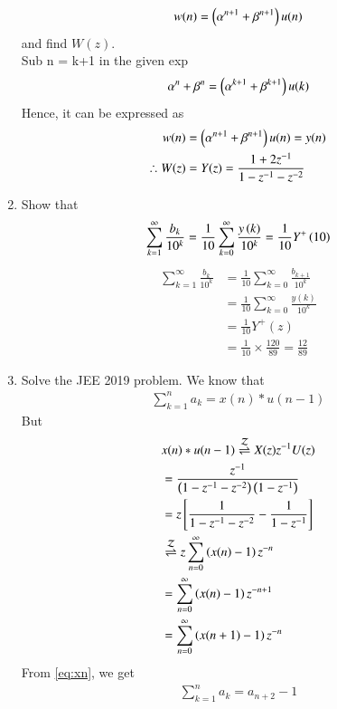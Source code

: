 \documentclass[journal,12pt,twocolumn]{IEEEtran}
\renewcommand\thesection{\arabic{section}}
\begin{document}
\begin{enumerate}[label=\thesection.\arabic*,ref=\thesection.\theenumi]
\begin{align}
w(n) =\left(\alpha^{n+1} + \beta^{n+1}\right)u(n)
\end{align}
and find $W(z)$.\\
\solution Sub n = k+1 in the given exp
\begin{align}
\alpha^n + \beta^n = \left(\alpha^{k + 1} + \beta^{k + 1}\right)u(k)
\end{align}
Hence, it can be expressed as
\begin{align}
w(n) &= \left(\alpha^{n+1} + \beta^{n+1}\right)u(n) = y(n)\\
\therefore W(z) &= Y(z) = \frac{1 + 2z^{-1}}{1 - z^{-1} - z^{-2}}
\end{align}
\item Show that 
\begin{align}
	\sum_{k=1}^{\infty}\frac{b_k}{10^k} =
	\frac{1}{10}\sum_{k=0}^{\infty}\frac{y\left(k\right)}{10^k} =\frac{1}{10}Y^{+}\left({10}\right)
\end{align}
\solution 
\begin{align}
\sum_{k=1}^{\infty}\frac{b_k}{10^k} &= \frac{1}{10}\sum_{k = 0}
^{\infty}\frac{b_{k+1}}{10^k}\\ &= \frac{1}{10}\sum_{k = 0}^{\infty}\frac{y(k)}{10^k}\\ &= \frac{1}{10}Y^+(z)\\ &= \frac{1}{10}\times\frac{120}{89} = \frac{12}{89}
\end{align}
\item Solve the JEE 2019 problem.
\solution We know that
\begin{align}
\sum_{k = 1}^{n}a_k = x(n)*u(n - 1)
\end{align}
But
\begin{align}
&x(n)*u(n - 1) \overset{\mathcal{Z}}{ \rightleftharpoons} X(z)z^{-1}U(z) \\
&= \frac{z^{-1}}{\left(1 - z^{-1} - z^{-2}\right)\left(1 - z^{-1}\right)}\\
&= z{}\left[\frac{1}{1 - z^{-1} - z^{-2}} - \frac{1}{1 - z^{-1}}\right]\\
&\overset{\mathcal{Z}}{ \rightleftharpoons} z\sum_{n = 0}^{\infty}\left(x(n) - 1\right)z^{-n}\\
&= \sum_{n = 0}^{\infty}\left(x(n) - 1\right)z^{-n + 1}\\
&= \sum_{n = 0}^{\infty}\left(x(n + 1) - 1\right)z^{-n}\\
\end{align}
From \eqref{eq:xn}, we get
\begin{align}
\sum_{k = 1}^{n}a_k = a_{n+2} - 1
\end{align}
\end{enumerate}
\end{document}
